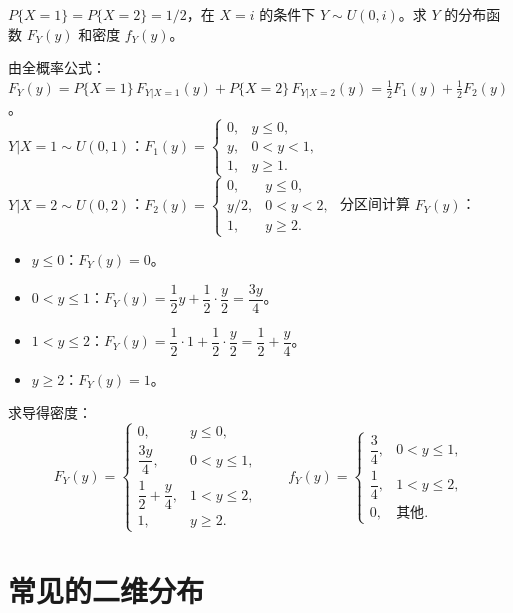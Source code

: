 ﻿\documentclass[lang=cn,11pt]{elegantbook}
\begin{document}
\begin{exercise}[混合条件分布求 $F_Y$] \label{exer:3-c17}
$P\{X=1\} = P\{X=2\} = 1/2$，在 $X=i$ 的条件下 $Y \sim U(0,i)$。求 $Y$ 的分布函数 $F_Y(y)$ 和密度 $f_Y(y)$。
\end{exercise}
\begin{solution}
由全概率公式：$F_Y(y) = P\{X=1\}\,F_{Y|X=1}(y) + P\{X=2\}\,F_{Y|X=2}(y) = \frac{1}{2}F_1(y) + \frac{1}{2}F_2(y)$。\\
$Y|X=1 \sim U(0,1)$：$F_1(y) = \begin{cases} 0, & y \leqslant 0, \\ y, & 0 < y < 1, \\ 1, & y \geqslant 1. \end{cases}$\\
$Y|X=2 \sim U(0,2)$：$F_2(y) = \begin{cases} 0, & y \leqslant 0, \\ y/2, & 0 < y < 2, \\ 1, & y \geqslant 2. \end{cases}$
分区间计算 $F_Y(y)$：
\begin{itemize}
    \item $y \leqslant 0$：$F_Y(y) = 0$。
    \item $0 < y \leqslant 1$：$F_Y(y) = \dfrac{1}{2}y + \dfrac{1}{2}\cdot\dfrac{y}{2} = \dfrac{3y}{4}$。
    \item $1 < y \leqslant 2$：$F_Y(y) = \dfrac{1}{2}\cdot 1 + \dfrac{1}{2}\cdot\dfrac{y}{2} = \dfrac{1}{2} + \dfrac{y}{4}$。
    \item $y \geqslant 2$：$F_Y(y) = 1$。
\end{itemize}
求导得密度：
\[
F_Y(y) = \begin{cases} 0, & y \leqslant 0, \\ \dfrac{3y}{4}, & 0 < y \leqslant 1, \\ \dfrac{1}{2} + \dfrac{y}{4}, & 1 < y \leqslant 2, \\ 1, & y \geqslant 2. \end{cases}
\qquad
f_Y(y) = \begin{cases} \dfrac{3}{4}, & 0 < y \leqslant 1, \\ \dfrac{1}{4}, & 1 < y \leqslant 2, \\ 0, & \text{其他}. \end{cases}
\]
\end{solution}


\section{常见的二维分布}
\end{document}
